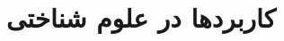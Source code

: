 \documentclass[11pt,a4paper,openany]{book}
\begin{document}
\frontmatter\tableofcontents
\mainmatter
\chapter{کاربردها در علوم شناختی}
\end{document}
